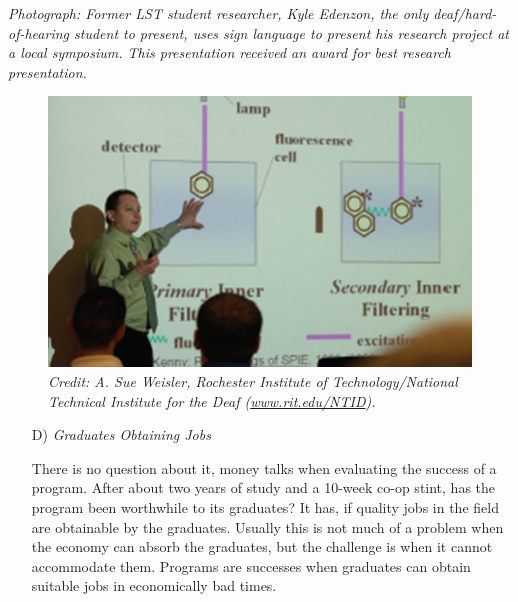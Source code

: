 \documentclass[11.5pt]{sig-alternate} %
\begin{document}
\begin{large}
\textit{Photograph: Former LST student researcher, Kyle Edenzon, the only deaf/hard-of-hearing student to present, uses sign language to present his research project at a local symposium. This presentation received an award for best research presentation.}

\begin{figure}[htp]
    \centering
    \captionsetup{font=large, labelfont=it}
    \includegraphics[width=\columnwidth]{Figure 1.jpg}
 \caption*{\textit{Credit: A. Sue Weisler, Rochester Institute of Technology/National Technical Institute for the Deaf (\url{www.rit.edu/NTID}).}}
    \label{Figure 1}
\end{figure}

\begin{enumerate}
    \item[D)] \textit{Graduates Obtaining Jobs}
    \begin{sloppypar}There is no question about it, money talks when evaluating the success of a program. After about two years of study and a 10-week co-op stint, has the program been worthwhile to its graduates? It has, if quality jobs in the field are obtainable by the graduates. Usually this is not much of a problem when the economy can absorb the graduates, but the challenge is when it cannot accommodate them. Programs are successes when graduates can obtain suitable jobs in economically bad times.


\end{sloppypar}
\end{enumerate}
\end{large}
\end{document}
